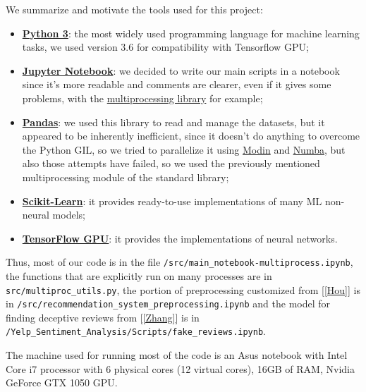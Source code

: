 We summarize and motivate the tools used for this project:
\begin{itemize}
	\item \textbf{\href{https://www.python.org/}{Python 3}}: the most widely used programming language for machine learning tasks, we used version 3.6 for compatibility with Tensorflow GPU;
	\item \textbf{\href{https://jupyter.org/}{Jupyter Notebook}}: we decided to write our main scripts in a notebook since it's more readable and comments are clearer, even if it gives some problems, with the \href{https://docs.python.org/3.6/library/multiprocessing.html}{multiprocessing library} for example;
	\item \textbf{\href{http://pandas.pydata.org}{Pandas}}: we used this library to read and manage the datasets, but it appeared to be inherently inefficient, since it doesn't do anything to overcome the Python GIL, so we tried to parallelize it using \href{https://modin.readthedocs.io/en/latest/index.html}{Modin} and \href{https://numba.pydata.org/}{Numba}, but also those attempts have failed, so we used the previously mentioned multiprocessing module of the standard library;
	\item \textbf{\href{http://scikit-learn.org}{Scikit-Learn}}: it provides ready-to-use implementations of many ML non-neural models;
	\item \textbf{\href{https://www.tensorflow.org/}{TensorFlow GPU}}: it provides the implementations of neural networks.
\end{itemize}

Thus, most of our code is in the file \texttt{/src/main\_notebook-multiprocess.ipynb}, the functions that are explicitly run on many processes are in \texttt{src/multiproc\_utils.py}, the portion of preprocessing customized from [\ref{Hou}] is in \texttt{/src/recommendation\_system\_preprocessing.ipynb} and the model for finding deceptive reviews from [\ref{Zhang}] is in \texttt{/Yelp\_Sentiment\_Analysis/Scripts/fake\_reviews.ipynb}.

The machine used for running most of the code is an Asus notebook with Intel Core i7 processor with 6 physical cores (12 virtual cores), 16GB of RAM, Nvidia GeForce GTX 1050 GPU.
